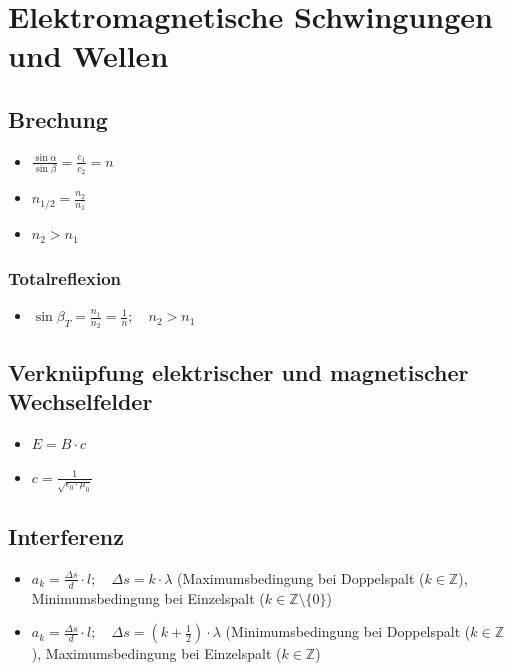 \documentclass[paper = a4, twocolumn]{scrartcl}
\begin{document}
\section{Elektromagnetische Schwingungen und Wellen}
\subsection{Brechung}
\begin{itemize}
\item
	\( \frac{\sin \alpha}{\sin \beta} = \frac{c_1}{c_2} = n \)
\item
	\( n_{1/2} = \frac{n_2}{n_1} \)
\item
	\( n_2 > n_1 \)
\end{itemize}

\subsubsection{Totalreflexion}
\begin{itemize}
\item
	\( \sin \beta_T = \frac{n_1}{n_2} = \frac{1}{n}; \quad n_2 > n_1 \)
\end{itemize}

\subsection{Verknüpfung elektrischer und magnetischer Wechselfelder}
\begin{itemize}
\item
	\( E = B \cdot c \)
\item
	\( c = \frac{1}{\sqrt{\epsilon_0 \cdot \mu_0}} \)
\end{itemize}

\subsection{Interferenz}
\begin{itemize}
\item
	\( a_k = \frac{\Delta s}{d} \cdot l; \quad \Delta s = k \cdot \lambda \)
	(Maximumsbedingung bei Doppelspalt (\( k \in \mathbb{Z} \)),
	Minimumsbedingung bei Einzelspalt (\( k \in \mathbb{Z}\setminus\{0\} \))
\item
	\( a_k = \frac{\Delta s}{d} \cdot l; \quad \Delta s = (k + \frac{1}{2})
	\cdot \lambda \) (Minimumsbedingung bei Doppelspalt (\( k \in
	\mathbb{Z} \)), Maximumsbedingung bei Einzelspalt (\( k
	\in \mathbb{Z} \))
\end{itemize}
\end{document}
